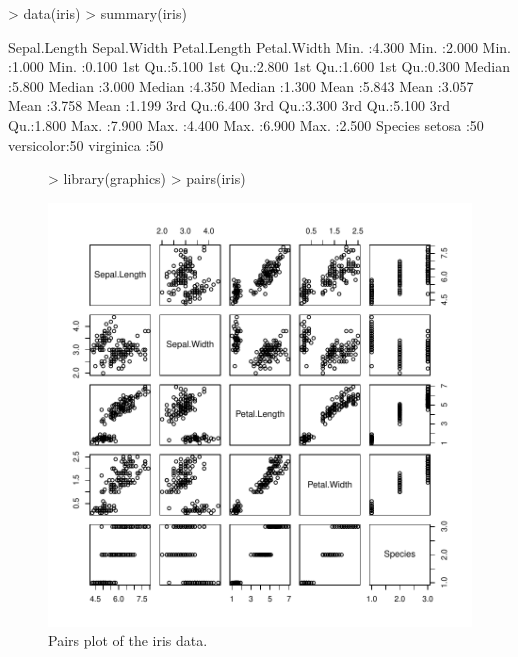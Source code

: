 \documentclass[a4paper]{article}
\begin{document}
\begin{Schunk}
\begin{Sinput}
> data(iris)
> summary(iris)
\end{Sinput}
\begin{Soutput}
  Sepal.Length    Sepal.Width     Petal.Length    Petal.Width   
 Min.   :4.300   Min.   :2.000   Min.   :1.000   Min.   :0.100  
 1st Qu.:5.100   1st Qu.:2.800   1st Qu.:1.600   1st Qu.:0.300  
 Median :5.800   Median :3.000   Median :4.350   Median :1.300  
 Mean   :5.843   Mean   :3.057   Mean   :3.758   Mean   :1.199  
 3rd Qu.:6.400   3rd Qu.:3.300   3rd Qu.:5.100   3rd Qu.:1.800  
 Max.   :7.900   Max.   :4.400   Max.   :6.900   Max.   :2.500  
       Species  
 setosa    :50  
 versicolor:50  
 virginica :50  
\end{Soutput}
\end{Schunk}


\begin{figure}[htbp]
  \begin{center}
\begin{Schunk}
\begin{Sinput}
> library(graphics)
> pairs(iris)
\end{Sinput}
\end{Schunk}
\includegraphics{Sweave-test-1-006}
     \caption{Pairs plot of the iris data.}
  \end{center}
\end{figure}
\end{document}
